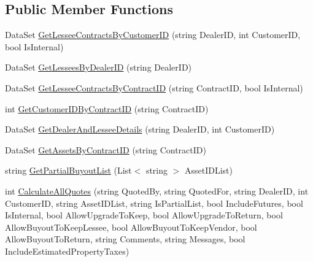 \subsection*{Public Member Functions}
\begin{DoxyCompactItemize}
\item 
Data\+Set \mbox{\hyperlink{interface_g_f_s_c_1_1_services_1_1_end_of_term_1_1_i_end_of_term_service_a3fab6d547ed54daeba07dc148a427c1e}{Get\+Lessee\+Contracts\+By\+Customer\+ID}} (string Dealer\+ID, int Customer\+ID, bool Is\+Internal)
\item 
Data\+Set \mbox{\hyperlink{interface_g_f_s_c_1_1_services_1_1_end_of_term_1_1_i_end_of_term_service_ac6ea9e490137a027bf6f324a33571097}{Get\+Lessees\+By\+Dealer\+ID}} (string Dealer\+ID)
\item 
Data\+Set \mbox{\hyperlink{interface_g_f_s_c_1_1_services_1_1_end_of_term_1_1_i_end_of_term_service_a239cda4fde97fcc9ffb96430790f20cb}{Get\+Lessee\+Contracts\+By\+Contract\+ID}} (string Contract\+ID, bool Is\+Internal)
\item 
int \mbox{\hyperlink{interface_g_f_s_c_1_1_services_1_1_end_of_term_1_1_i_end_of_term_service_a615c57f7fceacec4ebe4167707393723}{Get\+Customer\+I\+D\+By\+Contract\+ID}} (string Contract\+ID)
\item 
Data\+Set \mbox{\hyperlink{interface_g_f_s_c_1_1_services_1_1_end_of_term_1_1_i_end_of_term_service_a2cda1625eb210892ba686d45d99d15ff}{Get\+Dealer\+And\+Lessee\+Details}} (string Dealer\+ID, int Customer\+ID)
\item 
Data\+Set \mbox{\hyperlink{interface_g_f_s_c_1_1_services_1_1_end_of_term_1_1_i_end_of_term_service_a84c0cb4ce184d91111f0116efa36132f}{Get\+Assets\+By\+Contract\+ID}} (string Contract\+ID)
\item 
string \mbox{\hyperlink{interface_g_f_s_c_1_1_services_1_1_end_of_term_1_1_i_end_of_term_service_a4523038156d371d4cc3868b19e4e069d}{Get\+Partial\+Buyout\+List}} (List$<$ string $>$ Asset\+I\+D\+List)
\item 
int \mbox{\hyperlink{interface_g_f_s_c_1_1_services_1_1_end_of_term_1_1_i_end_of_term_service_a6452a880724034a6832ee9af55c8c659}{Calculate\+All\+Quotes}} (string Quoted\+By, string Quoted\+For, string Dealer\+ID, int Customer\+ID, string Asset\+I\+D\+List, string Is\+Partial\+List, bool Include\+Futures, bool Is\+Internal, bool Allow\+Upgrade\+To\+Keep, bool Allow\+Upgrade\+To\+Return, bool Allow\+Buyout\+To\+Keep\+Lessee, bool Allow\+Buyout\+To\+Keep\+Vendor, bool Allow\+Buyout\+To\+Return, string Comments, string Messages, bool Include\+Estimated\+Property\+Taxes)

\end{DoxyCompactItemize}
